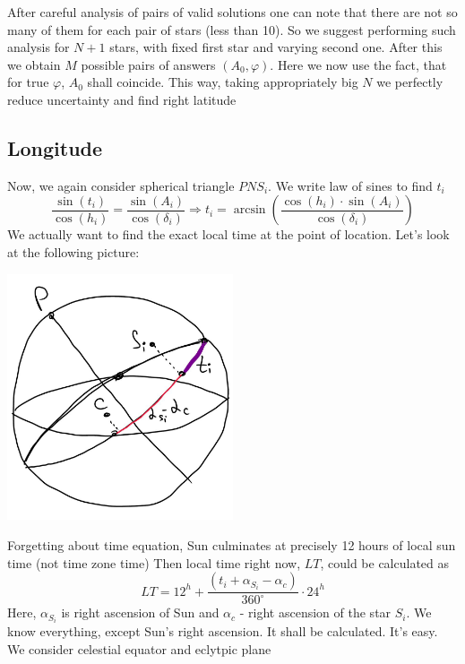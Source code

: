 \documentclass[a4paper,12pt]{article}
\begin{document}
\par
 
After careful analysis of pairs of valid solutions one can note that there are not so many of them for each pair of stars (less than 10). So we suggest performing such analysis for \(N + 1\) stars, with fixed first star and varying second one. After this we obtain \(M\) possible pairs of answers \((A_0, \varphi)\). Here we now use the fact, that for true \(\varphi\), \(A_0\) shall coincide. This way, taking appropriately big \(N\) we perfectly reduce uncertainty and find right latitude

\subsection{Longitude}
Now, we again consider spherical triangle \(PNS_i\).
We write law of sines to find \(t_i\)
\begin{equation}
\frac{\sin(t_i)}{\cos(h_i)} = \frac{\sin(A_i)}{\cos(\delta_i)} 
\Rightarrow 
t_i = \arcsin\left(\frac{\cos(h_i) \cdot \sin(A_i)}{\cos(\delta_i)}\right)
\end{equation}
We actually want to find the exact local time at the point of location. Let's look at the following picture:
\par
   \centering
    \includegraphics[width=0.5\textwidth]{time_det.jpg}
\par
Forgetting about time equation, Sun culminates at precisely 12 hours of local sun time (not time zone time)
Then local time right now, \(LT\), could be calculated as 
\begin{equation}
LT = 12^h + \frac{(t_i + \alpha_{S_i} - \alpha_c)}{360^\circ} \cdot 24^h
\end{equation}
Here, \(\alpha_{S_i}\) is right ascension of Sun and \(\alpha_c\) - right ascension of the star \(S_i\). We know everything, except Sun's right ascension. It shall be calculated. It's easy. We consider celestial equator and eclytpic plane
\end{document}
